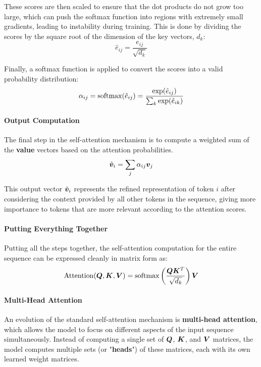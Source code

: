 These scores are then scaled to ensure that the dot products do not grow too large, which can push the softmax function into regions with extremely small gradients, leading to instability during training.
This is done by dividing the scores by the square root of the dimension of the key vectors, \(d_k\):
\[
\hat{e}_{ij} = \frac{e_{ij}}{\sqrt{d_k}}
\]

Finally, a softmax function is applied to convert the scores into a valid probability distribution:
\[
\alpha_{ij} = \operatorname{softmax}(\hat{e}_{ij}) = \frac{\exp(\hat{e}_{ij})}{\sum_{k} \exp(\hat{e}_{ik})}
\]

\paragraph{Output Computation}
The final step in the self-attention mechanism is to compute a weighted sum of the \textbf{value} vectors based on the attention probabilities.
\begin{equation}
    \label{eq:weighted_sum_values}
    \hat{\boldsymbol{v}}_i = \sum_{j} \alpha_{ij} \boldsymbol{v}_j
\end{equation}

This output vector \(\hat{\boldsymbol{v}}_i\) represents the refined representation of token \(i\) after considering the context provided by all other tokens in the sequence, giving more importance to tokens that are more relevant according to the attention scores.

\paragraph{Putting Everything Together}
Putting all the steps together, the self-attention computation for the entire sequence can be expressed cleanly in matrix form as:
\[
\text{Attention}(\boldsymbol{Q}, \boldsymbol{K}, \boldsymbol{V}) = \operatorname{softmax}\left(\frac{\boldsymbol{Q} \boldsymbol{K}^T}{\sqrt{d_k}}\right) \boldsymbol{V}
\]

\paragraph{Multi-Head Attention}
An evolution of the standard self-attention mechanism is \textbf{multi-head attention}, which allows the model to focus on different aspects of the input sequence simultaneously.
Instead of computing a single set of \(\boldsymbol{Q}\), \(\boldsymbol{K}\), and \(\boldsymbol{V}\) matrices, the model computes multiple sets (or "\textbf{heads}") of these matrices, each with its own learned weight matrices.

